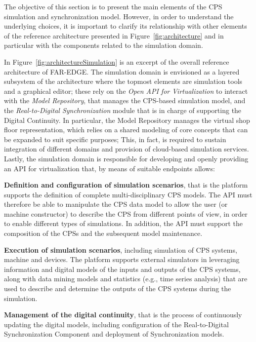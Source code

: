 The objective of this section is to present the main elements of the CPS simulation and synchronization model. However, in order to understand the underlying choices, it is important to clarify its relationship with other elements of the reference architecture presented in Figure~\ref{fig:architecture} and in particular with the components related to the simulation domain. 

In Figure~\ref{fig:architectureSimulation} is an excerpt of the overall reference architecture of FAR-EDGE. 
The simulation domain is envisioned as a layered subsystem of the architecture where the topmost elements are simulation tools and a graphical editor; these rely on the \textit{Open API for Virtualization} to interact with the \textit{Model Repository}, that manages the CPS-based simulation model, and the \textit{Real-to-Digital Synchronization} module that is in charge of supporting the Digital Continuity. 
In particular, the Model Repository manages the virtual shop floor representation, which relies on a shared modeling of core concepts that can be expanded to suit specific purposes; This, in fact, is required to sustain integration of different domains and provision of cloud-based simulation services. 
Lastly, the simulation domain is responsible for developing and openly providing an API for virtualization that, by means of suitable endpoints allows: 
\begin{description}
    \item \textbf{Definition and configuration of simulation scenarios}, that is the platform supports the definition of complete multi-disciplinary CPS models. The API must therefore be able to manipulate the CPS data model to allow the user (or machine constructor) to describe the CPS from different points of view, in order to enable different types of simulations. In addition, the API must support the composition of the CPSs and the subsequent model maintenance.  
    \item \textbf{Execution of simulation scenarios}, including simulation of CPS systems, machine and devices. The platform supports external simulators in leveraging information and digital models of the inputs and outputs of the CPS systems, along with data mining models and statistics (e.g., time series analysis) that are used to describe and determine the outputs of the CPS systems during the simulation.
    \item \textbf{Management of the digital continuity}, that is the process of continuously updating the digital models, including configuration of the Real-to-Digital Synchronization Component and deployment of Synchronization models. 
\end{description}



